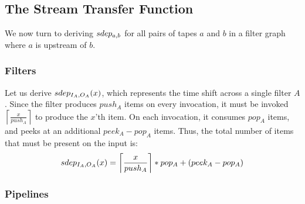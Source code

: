 \subsection{The Stream Transfer Function}
\label{sec:derivemin}

We now turn to deriving $sdep_{a, b}$ for all pairs of tapes $a$ and $b$
in a filter graph where $a$ is upstream of $b$.

\subsubsection{Filters}

Let us derive $sdep_{I_A, O_A}(x)$, which represents the time shift
across a single filter $A$.  Since the filter produces $push_A$ items
on every invocation, it must be invoked
$\left\lceil\frac{x}{push_A}\right\rceil$ to produce the $x$'th item.
On each invocation, it consumes $pop_A$ items, and peeks at an
additional $peek_A-pop_A$ items.  Thus, the total number of items that
must be present on the input is:
\begin{align}
\label{eq:minfilter}
sdep_{I_A, O_A}(x) = \left\lceil\frac{x}{push_A}\right\rceil*pop_A+(peek_A-pop_A)
\end{align}

\subsubsection{Pipelines}
\label{sec:timepipe}

